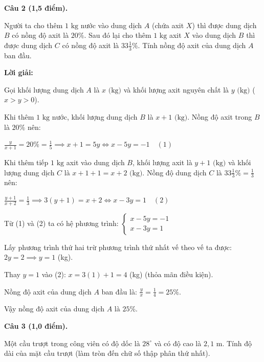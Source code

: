 \documentclass[12pt,a4paper]{article}
\begin{document}
\vspace{3mm}
\noindent\textbf{Câu 2 (1,5 điểm).}

Người ta cho thêm $1\text{ kg}$ nước vào dung dịch $A$ (chứa axit $X$) thì được dung dịch $B$ có nồng độ axit là $20\%$. Sau đó lại cho thêm $1\text{ kg}$ axit $X$ vào dung dịch $B$ thì được dung dịch $C$ có nồng độ axit là $33\frac{1}{3}\%$. Tính nồng độ axit của dung dịch $A$ ban đầu.

\noindent\textbf{Lời giải:}

Gọi khối lượng dung dịch $A$ là $x\text{ (kg)}$ và khối lượng axit nguyên chất là $y\text{ (kg)}$ ($x > y > 0$).\par Khi thêm $1\text{ kg}$ nước, khối lượng dung dịch $B$ là $x + 1\text{ (kg)}$. Nồng độ axit trong $B$ là $20\%$ nên:\par $\frac{y}{x + 1} = 20\% = \frac{1}{5} \implies x + 1 = 5y \iff x - 5y = -1 \quad (1)$\par Khi thêm tiếp $1\text{ kg}$ axit vào dung dịch $B$, khối lượng axit là $y + 1\text{ (kg)}$ và khối lượng dung dịch $C$ là $x + 1 + 1 = x + 2\text{ (kg)}$. Nồng độ dung dịch $C$ là $33\frac{1}{3}\% = \frac{1}{3}$ nên:\par $\frac{y + 1}{x + 2} = \frac{1}{3} \implies 3(y + 1) = x + 2 \iff x - 3y = 1 \quad (2)$\par Từ (1) và (2) ta có hệ phương trình: $\begin{cases} x - 5y = -1 \\ x - 3y = 1 \end{cases}$\par Lấy phương trình thứ hai trừ phương trình thứ nhất vế theo vế ta được: $2y = 2 \implies y = 1$ (kg).\par Thay $y = 1$ vào (2): $x = 3(1) + 1 = 4$ (kg) (thỏa mãn điều kiện).\par Nồng độ axit của dung dịch $A$ ban đầu là: $\frac{y}{x} = \frac{1}{4} = 25\%$.\par Vậy nồng độ axit của dung dịch $A$ là $25\%$.

\vspace{3mm}
\newpage
\noindent\textbf{Câu 3 (1,0 điểm).}

Một cầu trượt trong công viên có độ dốc là $28^\circ$ và có độ cao là $2{,}1\text{ m}$. Tính độ dài của mặt cầu trượt (làm tròn đến chữ số thập phân thứ nhất).
\begin{center}
\end{center}
\end{document}
